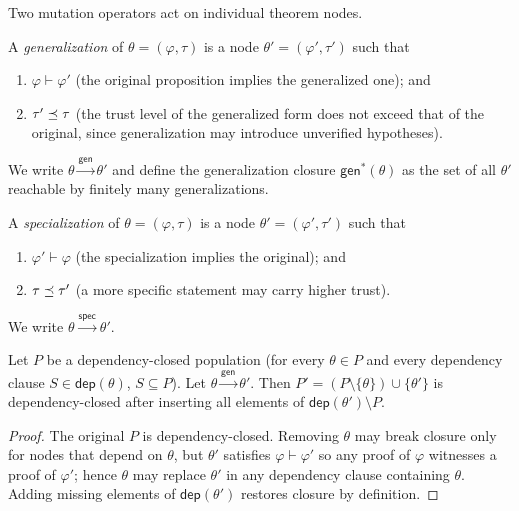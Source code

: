 \documentclass[11pt]{article}
\providecommand{\gen}{\mathsf{gen}}         %
\providecommand{\spec}{\mathsf{spec}}       %
\providecommand{\dep}{\mathsf{dep}}         %
\begin{document}
Two mutation operators act on individual theorem nodes.

\begin{definition}[Generalization]\label{def:gen}
A \emph{generalization} of $\theta = (\varphi, \tau)$ is a node
$\theta' = (\varphi', \tau')$ such that
\begin{enumerate}[leftmargin=1.5em]
  \item $\varphi \vdash \varphi'$ (the original proposition implies
    the generalized one); and
  \item $\tau' \preceq \tau$ (the trust level of the generalized form
    does not exceed that of the original, since generalization may
    introduce unverified hypotheses).
\end{enumerate}
We write $\theta \xrightarrow{\gen} \theta'$ and define the
generalization closure $\gen^*(\theta)$ as the set of all
$\theta'$ reachable by finitely many generalizations.
\end{definition}

\begin{definition}[Specialization]\label{def:spec}
A \emph{specialization} of $\theta = (\varphi, \tau)$ is a node
$\theta' = (\varphi', \tau')$ such that
\begin{enumerate}[leftmargin=1.5em]
  \item $\varphi' \vdash \varphi$ (the specialization implies the
    original); and
  \item $\tau \preceq \tau'$ (a more specific statement may carry
    higher trust).
\end{enumerate}
We write $\theta \xrightarrow{\spec} \theta'$.
\end{definition}

\begin{lemma}\label{lem:mut-dep}
Let $P$ be a dependency-closed population (\ie for every
$\theta \in P$ and every dependency clause $S \in \dep(\theta)$,
$S \subseteq P$).  Let $\theta \xrightarrow{\gen} \theta'$.  Then
$P' = (P \setminus \{\theta\}) \cup \{\theta'\}$ is dependency-closed
after inserting all elements of $\dep(\theta') \setminus P$.
\end{lemma}
\begin{proof}
The original $P$ is dependency-closed.  Removing $\theta$ may break
closure only for nodes that depend on $\theta$, but $\theta'$ satisfies
$\varphi \vdash \varphi'$ so any proof of $\varphi$ witnesses a proof
of $\varphi'$; hence $\theta$ may replace $\theta'$ in any dependency
clause containing $\theta$.  Adding missing elements of
$\dep(\theta')$ restores closure by definition.
\end{proof}
\end{document}
